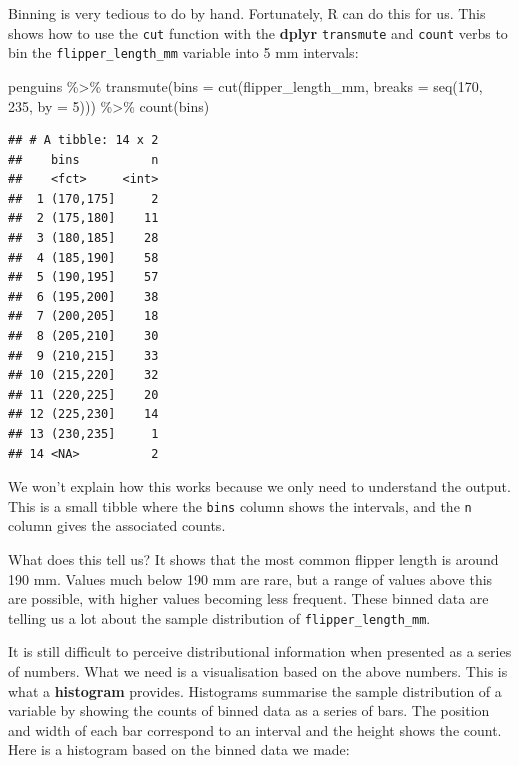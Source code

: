 \documentclass[
]{book}
\newenvironment{Shaded}{\begin{snugshade}}{\end{snugshade}}
\newcommand{\AttributeTok}[1]{\textcolor[rgb]{0.77,0.63,0.00}{#1}}
\newcommand{\DecValTok}[1]{\textcolor[rgb]{0.00,0.00,0.81}{#1}}
\newcommand{\FunctionTok}[1]{\textcolor[rgb]{0.00,0.00,0.00}{#1}}
\newcommand{\NormalTok}[1]{#1}
\newcommand{\SpecialCharTok}[1]{\textcolor[rgb]{0.00,0.00,0.00}{#1}}
\begin{document}
Binning is very tedious to do by hand. Fortunately, R can do this for us. This shows how to use the \texttt{cut} function with the \textbf{dplyr} \texttt{transmute} and \texttt{count} verbs to bin the \texttt{flipper\_length\_mm} variable into 5 mm intervals:

\begin{Shaded}
\begin{Highlighting}[]
\NormalTok{penguins }\SpecialCharTok{\%\textgreater{}\%} 
  \FunctionTok{transmute}\NormalTok{(}\AttributeTok{bins =} \FunctionTok{cut}\NormalTok{(flipper\_length\_mm, }\AttributeTok{breaks =} \FunctionTok{seq}\NormalTok{(}\DecValTok{170}\NormalTok{, }\DecValTok{235}\NormalTok{, }\AttributeTok{by =} \DecValTok{5}\NormalTok{))) }\SpecialCharTok{\%\textgreater{}\%}
  \FunctionTok{count}\NormalTok{(bins)}
\end{Highlighting}
\end{Shaded}

\begin{verbatim}
## # A tibble: 14 x 2
##    bins          n
##    <fct>     <int>
##  1 (170,175]     2
##  2 (175,180]    11
##  3 (180,185]    28
##  4 (185,190]    58
##  5 (190,195]    57
##  6 (195,200]    38
##  7 (200,205]    18
##  8 (205,210]    30
##  9 (210,215]    33
## 10 (215,220]    32
## 11 (220,225]    20
## 12 (225,230]    14
## 13 (230,235]     1
## 14 <NA>          2
\end{verbatim}

We won't explain how this works because we only need to understand the output. This is a small tibble where the \texttt{bins} column shows the intervals, and the \texttt{n} column gives the associated counts.

What does this tell us? It shows that the most common flipper length is around 190 mm. Values much below 190 mm are rare, but a range of values above this are possible, with higher values becoming less frequent. These binned data are telling us a lot about the sample distribution of \texttt{flipper\_length\_mm}.

It is still difficult to perceive distributional information when presented as a series of numbers. What we need is a visualisation based on the above numbers. This is what a \textbf{histogram} provides. Histograms summarise the sample distribution of a variable by showing the counts of binned data as a series of bars. The position and width of each bar correspond to an interval and the height shows the count. Here is a histogram based on the binned data we made:
\end{document}
